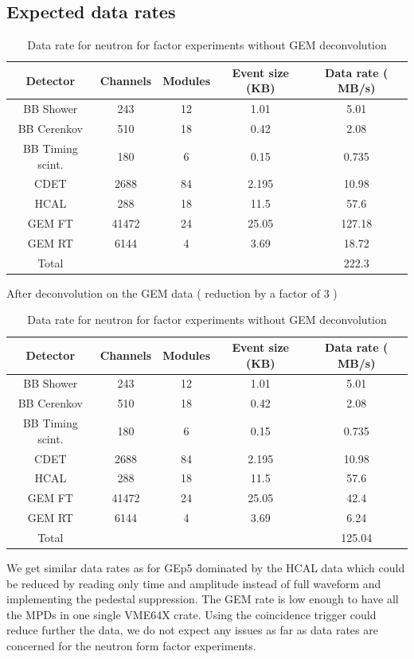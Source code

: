 \documentclass{article}
\begin{document}
\subsection {Expected data rates}
\begin{table}
\begin{tabular}{|c|c|c|c|c|}
\hline
Detector & Channels & Modules & Event size (KB) & Data rate ( MB/s)\\
\hline
BB Shower&243&12&1.01&5.01\\
BB Cerenkov&510&18&0.42&2.08\\
BB Timing scint.&180&6&0.15&0.735\\
CDET&2688&84&2.195&10.98\\
HCAL&288&18&11.5&57.6\\
GEM FT&41472&24&25.05&127.18\\
GEM RT&6144&4&3.69&18.72\\
\hline
Total & & & & 222.3\\
\hline
\end{tabular}
\caption{Data rate for neutron for factor experiments without GEM deconvolution\label{GEnRateNoDeco}}
\end{table}
After deconvolution on the GEM data ( reduction by a factor of 3 )
\begin{table}
\begin{tabular}{|c|c|c|c|c|}
\hline
Detector & Channels & Modules & Event size (KB)  & Data rate ( MB/s)\\
\hline
BB Shower&243&12&1.01&5.01\\
BB Cerenkov&510&18&0.42&2.08\\
BB Timing scint.&180&6&0.15&0.735\\
CDET&2688&84&2.195&10.98\\
HCAL&288&18&11.5&57.6\\
GEM FT&41472&24&25.05&42.4\\
GEM RT&6144&4&3.69&6.24\\
\hline
Total & & & & 125.04\\
\hline
\end{tabular}
\caption{Data rate for neutron for factor experiments without GEM deconvolution\label{GEnRateDeco}}
\end{table}
We get similar data rates as for GEp5 dominated by the HCAL data which could be reduced by reading only time and amplitude instead of full waveform and implementing the pedestal suppression.
The GEM rate is low enough to have all the MPDs in one single VME64X crate.
Using the coincidence trigger could reduce further the data, we do not expect any issues as far as data rates are concerned for the neutron form factor experiments.
\end{document}
